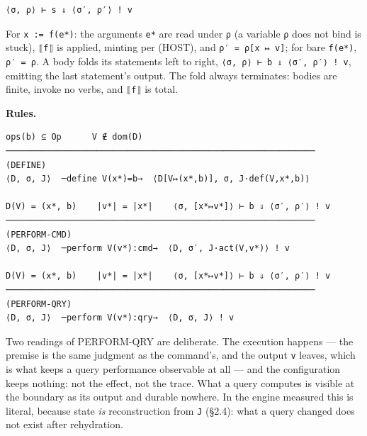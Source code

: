 \documentclass[
]{article}
\begin{document}
\begin{verbatim}
⟨σ, ρ⟩ ⊢ s ⇓ ⟨σ′, ρ′⟩ ! v
\end{verbatim}

For \texttt{x\ :=\ f(e*)}: the arguments \texttt{e*} are read under
\texttt{ρ} (a variable \texttt{ρ} does not bind is stuck), \texttt{⟦f⟧}
is applied, minting per (HOST), and \texttt{ρ′\ =\ ρ{[}x\ ↦\ v{]}}; for
bare \texttt{f(e*)}, \texttt{ρ′\ =\ ρ}. A body folds its statements left
to right, \texttt{⟨σ,\ ρ⟩\ ⊢\ b\ ⇓\ ⟨σ′,\ ρ′⟩\ !\ v}, emitting the last
statement's output. The fold always terminates: bodies are finite,
invoke no verbs, and \texttt{⟦f⟧} is total.

\textbf{Rules.}

\begin{verbatim}
ops(b) ⊆ Op      V ∉ dom(D)
─────────────────────────────────────────────────────────────  (DEFINE)
⟨D, σ, J⟩  ─define V(x*)=b→  ⟨D[V↦(x*,b)], σ, J·def(V,x*,b)⟩

D(V) = (x*, b)    |v*| = |x*|    ⟨σ, [x*↦v*]⟩ ⊢ b ⇓ ⟨σ′, ρ′⟩ ! v
─────────────────────────────────────────────────────────────  (PERFORM-CMD)
⟨D, σ, J⟩  ─perform V(v*):cmd→  ⟨D, σ′, J·act(V,v*)⟩ ! v

D(V) = (x*, b)    |v*| = |x*|    ⟨σ, [x*↦v*]⟩ ⊢ b ⇓ ⟨σ′, ρ′⟩ ! v
─────────────────────────────────────────────────────────────  (PERFORM-QRY)
⟨D, σ, J⟩  ─perform V(v*):qry→  ⟨D, σ, J⟩ ! v
\end{verbatim}

Two readings of PERFORM-QRY are deliberate. The execution happens ---
the premise is the same judgment as the command's, and the output
\texttt{v} leaves, which is what keeps a query performance observable at
all --- and the configuration keeps nothing: not the effect, not the
trace. What a query computes is visible at the boundary as its output
and durable nowhere. In the engine measured this is literal, because
state \emph{is} reconstruction from \texttt{J} (§2.4): what a query
changed does not exist after rehydration.
\end{document}

